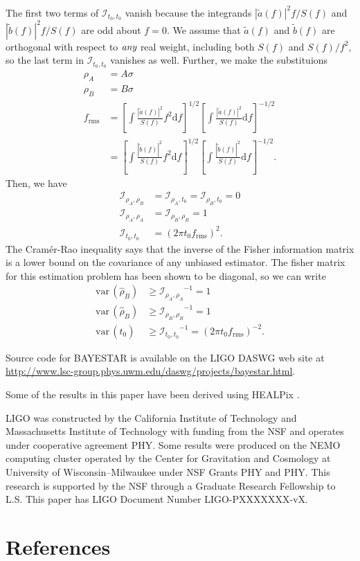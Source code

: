 \documentclass{iopart}
\begin{document}
%
The first two terms of $\mathcal{I}_{t_0,t_0}$ vanish because the integrands $|\tilde{a}(f)|^2 f / S(f)$ and $|\tilde{b}(f)|^2 f / S(f)$ are odd about $f = 0$.  We assume that $\tilde{a}(f)$ and $\tilde{b}(f)$ are orthogonal with respect to $\emph{any}$ real weight, including both $S(f)$ and $S(f) / f^2$, so the last term in $\mathcal{I}_{t_0,t_0}$ vanishes as well.  Further, we make the substituions
%
\begin{eqnarray*}
	\rho_A &= A \sigma \\
	\rho_B &= B \sigma \\
	f_\mathrm{rms} &= \left[ \int \frac{|\tilde{a}(f)|^2}{S(f)} f^2\mathrm{d}f \right] ^ {1/2} \left[\int \frac{|\tilde{a}(f)|^2}{S(f)} \mathrm{d}f \right] ^ {-1/2} \\
	&=  \left[ \int \frac{|\tilde{b}(f)|^2}{S(f)} f^2\mathrm{d}f \right] ^ {1/2} \left[\int \frac{|\tilde{b}(f)|^2}{S(f)} \mathrm{d}f \right] ^ {-1/2}.
\end{eqnarray*}
%
Then, we have
%
\begin{eqnarray*}
	\mathcal{I}_{\rho_A,\rho_B} &= \mathcal{I}_{\rho_A,t_0} = \mathcal{I}_{\rho_B,t_0} = 0 \\
	\mathcal{I}_{\rho_A,\rho_A} &= \mathcal{I}_{\rho_B,\rho_B} = 1 \\
	\mathcal{I}_{t_0,t_0} &= (2 \pi t_0 f_\mathrm{rms})^2.
\end{eqnarray*}
%
The Cram\'{e}r-Rao inequality says that the inverse of the Fisher information matrix is a lower bound on the covariance of any unbiased estimator.  The fisher matrix for this estimation problem has been shown to be diagonal, so we can write
%
\begin{eqnarray}
	\mathrm{var}\, (\hat{\rho}_B) &\geq {\mathcal{I}_{\rho_A,\rho_A}}^{-1} = 1 \\
	\mathrm{var}\, (\hat{\rho}_B) &\geq {\mathcal{I}_{\rho_B,\rho_B}}^{-1} = 1 \\
	\mathrm{var}\, (\hat{t}_0) &\geq {\mathcal{I}_{t_0,t_0}}^{-1} = (2 \pi t_0 f_\mathrm{rms})^{-2}.
\end{eqnarray}


\ack Source code for \ac{BAYESTAR} is available on the \acs{LIGO} \acl{DASWG} web site at \url{http://www.lsc-group.phys.uwm.edu/daswg/projects/bayestar.html}.

Some of the results in this paper have been derived using HEALPix \cite{healpix}.

\acs{LIGO} was constructed by the California Institute of Technology and Massachusetts Institute of Technology with funding from the \ac{NSF} and operates under cooperative agreement PHY.  Some results were produced on the NEMO computing cluster operated by the Center for Gravitation and Cosmology at University of Wisconsin\nobreakdashes--Milwaukee under \ac{NSF} Grants PHY and PHY.  This research is supported by the \ac{NSF} through a Graduate Research Fellowship to L.S.  This paper has \acs{LIGO} Document Number \acs{LIGO}\nobreakdashes-PXXXXXXX\nobreakdashes-vX.


\section*{References}


\end{document}
